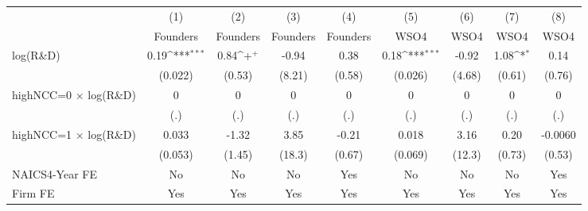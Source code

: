 {
\def\sym#1{\ifmmode^{#1}\else\(^{#1}\)\fi}
\begin{tabular}{l*{8}{c}}
\toprule
                    &\multicolumn{1}{c}{(1)}&\multicolumn{1}{c}{(2)}&\multicolumn{1}{c}{(3)}&\multicolumn{1}{c}{(4)}&\multicolumn{1}{c}{(5)}&\multicolumn{1}{c}{(6)}&\multicolumn{1}{c}{(7)}&\multicolumn{1}{c}{(8)}\\
                    &\multicolumn{1}{c}{Founders}&\multicolumn{1}{c}{Founders}&\multicolumn{1}{c}{Founders}&\multicolumn{1}{c}{Founders}&\multicolumn{1}{c}{WSO4}&\multicolumn{1}{c}{WSO4}&\multicolumn{1}{c}{WSO4}&\multicolumn{1}{c}{WSO4}\\
\midrule
log(R\&D)           &        0.19\sym{***}&        0.84\sym{+}  &       -0.94         &        0.38         &        0.18\sym{***}&       -0.92         &        1.08\sym{*}  &        0.14         \\
                    &     (0.022)         &      (0.53)         &      (8.21)         &      (0.58)         &     (0.026)         &      (4.68)         &      (0.61)         &      (0.76)         \\
\addlinespace
highNCC=0 $\times$ log(R\&D)&           0         &           0         &           0         &           0         &           0         &           0         &           0         &           0         \\
                    &         (.)         &         (.)         &         (.)         &         (.)         &         (.)         &         (.)         &         (.)         &         (.)         \\
\addlinespace
highNCC=1 $\times$ log(R\&D)&       0.033         &       -1.32         &        3.85         &       -0.21         &       0.018         &        3.16         &        0.20         &     -0.0060         \\
                    &     (0.053)         &      (1.45)         &      (18.3)         &      (0.67)         &     (0.069)         &      (12.3)         &      (0.73)         &      (0.53)         \\
\addlinespace
NAICS4-Year FE      &          No         &          No         &          No         &         Yes         &          No         &          No         &          No         &         Yes         \\
\addlinespace
Firm FE             &         Yes         &         Yes         &         Yes         &         Yes         &         Yes         &         Yes         &         Yes         &         Yes         \\

\end{tabular}}
